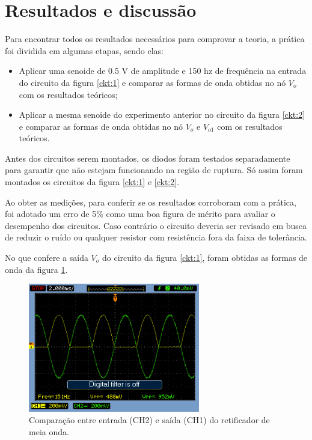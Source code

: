 \section{Resultados e discussão}

Para encontrar todos os resultados necessários para comprovar a teoria, a prática foi dividida em algumas etapas, sendo elas:


\begin{itemize}

    \item Aplicar uma senoide de 0.5 V de amplitude e 150 hz de frequência na entrada do circuito da figura \ref{ckt:1}
    e comparar as formas de onda obtidas no nó $V_o$ com os resultados teóricos;
    
    \item Aplicar a mesma senoide do experimento anterior no circuito da figura \ref{ckt:2} e comparar as formas de onda obtidas no nó $V_o$ e $V_{o1}$ com os resultados teóricos.
\end{itemize}

Antes dos circuitos serem montados, os diodos foram testados separadamente para garantir que não estejam funcionando na região de ruptura. Só assim foram montados os circuitos da figura \ref{ckt:1} e \ref{ckt:2}.

Ao obter as medições, para conferir se os resultados corroboram com a prática, foi adotado um erro de 5\% como uma boa figura de mérito para avaliar o desempenho dos circuitos. Caso contrário o circuito deveria ser revisado em busca de reduzir o ruído ou qualquer resistor com resistência fora da faixa de tolerância. 

No que confere a saída $V_o$ do circuito da figura \ref{ckt:1}, foram obtidas as formas de onda da figura \ref{fig1}.

\begin{figure}[H] 
\centering
\includegraphics[width=7.5cm]{images/VO_1.png}
\caption{Comparação entre entrada (CH2) e saída (CH1) do retificador de meia onda.}
\label{fig1} 
\end{figure}

